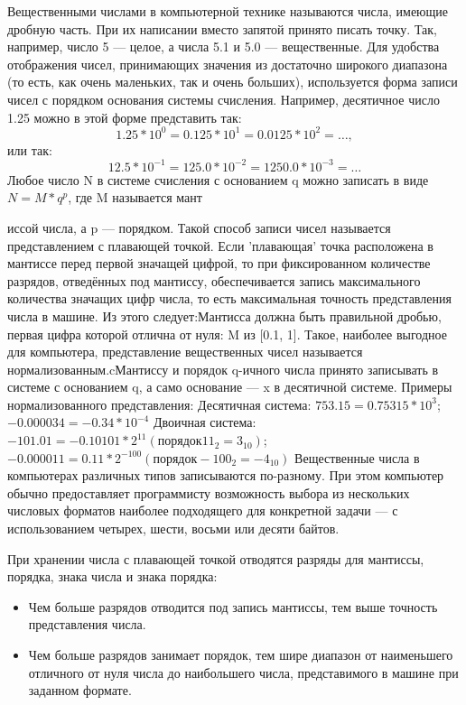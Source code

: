 \documentclass[a4paper]{article}
\begin{document}
Вещественными числами в компьютерной технике называются числа, имеющие дробную часть. При их написании вместо запятой принято писать точку. Так, например, число 5 — целое, а числа 5.1 и 5.0 — вещественные. Для удобства отображения чисел, принимающих значения из достаточно широкого диапазона (то есть, как очень маленьких, так и очень больших), используется форма записи чисел с порядком основания системы счисления. Например, десятичное число 1.25 можно в этой форме представить так:
\[1.25*10^{0} = 0.125*10^{1} = 0.0125*10^{2} = \ldots ,\]
или так:
\[12.5*10^{-1} = 125.0*10^{-2} = 1250.0*10^{-3} = \ldots \]
Любое число N в системе счисления с основанием q можно записать в виде $N = M * q^{p}$, где M называется мант



иссой числа, а p — порядком. Такой способ записи чисел называется представлением с плавающей точкой.
Если 'плавающая' точка расположена в мантиссе перед первой значащей цифрой, то при фиксированном количестве разрядов, отведённых под мантиссу, обеспечивается запись максимального количества значащих цифр числа, то есть максимальная точность представления числа в машине. Из этого следует:\newline Мантисса должна быть правильной дробью, первая цифра которой отлична от нуля: M из [0.1, 1]. Такое, наиболее выгодное для компьютера, представление вещественных чисел называется нормализованным.cМантиссу и порядок q-ичного числа принято записывать в системе с основанием q, а само основание --- x в десятичной системе.
Примеры нормализованного представления: \newline
Десятичная система: \newline
$753.15 = 0.75315*10^{3}$;
$-0.000034 = -0.34*10^{-4}$ \newline
Двоичная система: \newline
$-101.01 = -0.10101*2^{11} (порядок 11_{2} = 3_{10})$;
$-0.000011 = 0.11*2^{-100} (порядок -100_{2} = -4_{10})$ \newline
Вещественные числа в компьютерах различных типов записываются по-разному. При этом компьютер обычно предоставляет программисту возможность выбора из нескольких числовых форматов наиболее подходящего для конкретной задачи — с использованием четырех, шести, восьми или десяти байтов.

При хранении числа с плавающей точкой отводятся разряды для мантиссы, порядка, знака числа и знака порядка:
\begin{itemize}
\item Чем больше разрядов отводится под запись мантиссы, тем выше точность представления числа.
\item Чем больше разрядов занимает порядок, тем шире диапазон от наименьшего отличного от нуля числа до наибольшего числа, представимого в машине при заданном формате.
\end{itemize}
\end{document}
